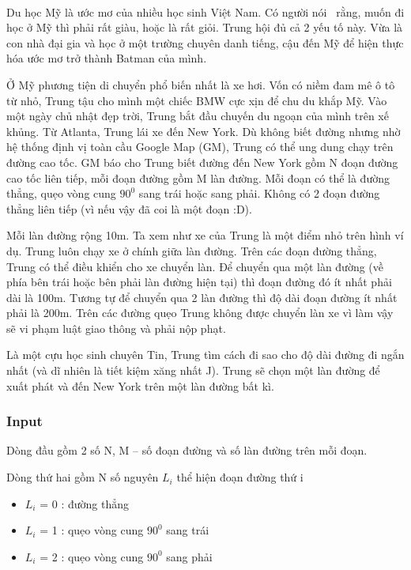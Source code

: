 

 

Du học Mỹ là ước mơ của nhiều học sinh Việt Nam. Có người nói  rằng, muốn đi học ở Mỹ thì phải rất giàu, hoặc là rất giỏi. Trung hội đủ cả 2 yếu tố này. Vừa là con nhà đại gia và học ở một trường chuyên danh tiếng, cậu đến Mỹ để hiện thực hóa ước mơ trở thành Batman của mình. \textbf{}

Ở Mỹ phương tiện di chuyển phổ biến nhất là xe hơi. Vốn có niềm đam mê ô tô từ nhỏ, Trung tậu cho mình một chiếc BMW cực xịn để chu du khắp Mỹ. Vào một ngày chủ nhật đẹp trời, Trung bắt đầu chuyến du ngoạn của mình trên xế khủng. Từ Atlanta, Trung lái xe đến New York. Dù không biết đường nhưng nhờ hệ thống định vị toàn cầu Google Map (GM), Trung có thể ung dung chạy trên đường cao tốc. GM báo cho Trung biết đường đến New York gồm N đoạn đường cao tốc liên tiếp, mỗi đoạn đường gồm M làn đường. Mỗi đoạn có thể là đường thẳng, quẹo vòng cung $90^{0}$ sang trái hoặc sang phải. Không có 2 đoạn đường thẳng liên tiếp (vì nếu vậy đã coi là một đoạn :D).

Mỗi làn đường rộng 10m. Ta xem như xe của Trung là một điểm nhỏ trên hình ví dụ. Trung luôn chạy xe ở chính giữa làn đường. Trên các đoạn đường thẳng, Trung có thể điều khiển cho xe chuyển làn. Để chuyển qua một làn đường (về phía bên trái hoặc bên phải làn đường hiện tại) thì đoạn đường đó ít nhất phải dài là 100m. Tương tự để chuyển qua 2 làn đường thì độ dài đoạn đường ít nhất phải là 200m. Trên các đường quẹo Trung không được chuyển làn xe vì làm vậy sẽ vi phạm luật giao thông và phải nộp phạt.

Là một cựu học sinh chuyên Tin, Trung tìm cách đi sao cho độ dài đường đi ngắn nhất (và dĩ nhiên là tiết kiệm xăng nhất J). Trung sẽ chọn một làn đường để xuất phát và đến New York trên một làn đường bất kì.

\subsubsection{Input}

Dòng đầu gồm 2 số N, M – số đoạn đường và số làn đường trên mỗi đoạn.

Dòng thứ hai gồm N số nguyên $L_{i}$ thể hiện đoạn đường thứ i
\begin{itemize}
	\item $L_{i}$ = 0 : đường thẳng
	\item $L_{i}$ = 1 : quẹo vòng cung $90^{0}$ sang trái
	\item $L_{i}$ = 2 : quẹo vòng cung $90^{0}$ sang phải
\end{itemize}

